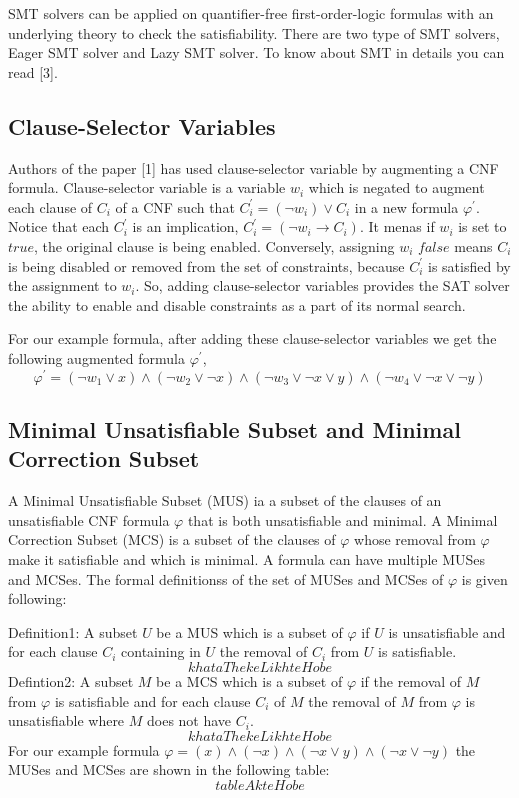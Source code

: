 SMT solvers can be applied on quantifier-free first-order-logic formulas with an underlying theory to check the satisfiability. There are two type of SMT solvers, Eager SMT solver and Lazy SMT solver. To know about SMT in details you can read [3].
\subsection{Clause-Selector Variables}
Authors of the paper [1] has used clause-selector variable by augmenting a CNF formula. Clause-selector variable is a variable $w_{i}$ which is negated to augment each clause of $C_{i}$ of a CNF such that $C^{\prime}_{i}=(\neg w_{i})\vee C_{i}$ in a new formula $\varphi^{\prime}$. Notice that each $C^{\prime}_{i}$ is an implication, $C^{\prime}_{i}=(\neg w_{i}\rightarrow C_{i})$. It menas if $w_{i}$ is set to $true$, the original clause is being enabled. Conversely, assigning $w_{i}$ $false$ means $C_{i}$ is being disabled or removed from the set of constraints, because $C^{\prime}_{i}$ is satisfied by the assignment to $w_{i}$. So, adding clause-selector variables provides the SAT solver the ability to enable and disable constraints as a part of its normal search.

For our example formula, after adding these clause-selector variables we get the following augmented formula $\varphi^{\prime}$, 
$$\varphi^{\prime}=(\neg w_{1}\vee x)\wedge(\neg w_{2}\vee \neg x)\wedge(\neg w_{3}\vee \neg x\vee y)\wedge(\neg w_{4}\vee \neg x \vee \neg y)$$
\subsection{Minimal Unsatisfiable Subset and Minimal Correction Subset }
A Minimal Unsatisfiable Subset (MUS) ia a subset of the clauses of an unsatisfiable CNF formula $\varphi$ that is both unsatisfiable and minimal. A Minimal Correction Subset (MCS) is a subset of the clauses of $\varphi$ whose removal from $\varphi$ make it satisfiable and which is minimal. A formula can have multiple MUSes and MCSes. The formal definitionss of the set of MUSes and MCSes of $\varphi$ is given following:

Definition1: A subset $U$ be a MUS which is a subset of $\varphi$ if $U$ is unsatisfiable and for each clause $C_{i}$ containing in $U$ the removal of $C_{i}$ from $U$ is satisfiable.
$$khataThekeLikhteHobe$$
Defintion2: A subset $M$ be a MCS which is a subset of $\varphi$ if the removal of $M$ from $\varphi$ is satisfiable and for each clause $C_{i}$ of $M$ the removal of $M$ from $\varphi$ is unsatisfiable where $M$ does not have $C_{i}$.
$$khataThekeLikhteHobe$$
For our example formula $\varphi=(x)\wedge(\neg x)\wedge(\neg x\vee y)\wedge(\neg x \vee \neg y)$ the MUSes and MCSes are shown in the following table:
$$tableAkteHobe$$
